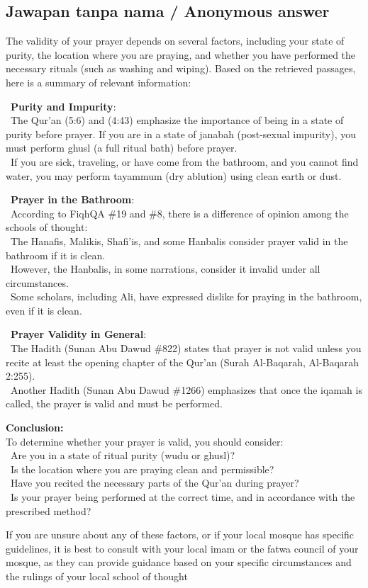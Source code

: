 \documentclass[11pt,a4paper]{article}
\begin{document}
\subsection*{Jawapan tanpa nama / Anonymous answer}
The validity of your prayer depends on several factors, including your state of purity, the location where you are praying, and whether you have performed the necessary rituals (such as washing and wiping). Based on the retrieved passages, here is a summary of relevant information:\par\medskip \textbullet\ \textbf{Purity and Impurity}:\\ \textbullet\ The Qur'an (5:6) and (4:43) emphasize the importance of being in a state of purity before prayer. If you are in a state of janabah (post-sexual impurity), you must perform ghusl (a full ritual bath) before prayer.\\ \textbullet\ If you are sick, traveling, or have come from the bathroom, and you cannot find water, you may perform tayammum (dry ablution) using clean earth or dust.\par\medskip \textbullet\ \textbf{Prayer in the Bathroom}:\\ \textbullet\ According to FiqhQA \#19 and \#8, there is a difference of opinion among the schools of thought:\\ \textbullet\ The Hanafis, Malikis, Shafi'is, and some Hanbalis consider prayer valid in the bathroom if it is clean.\\ \textbullet\ However, the Hanbalis, in some narrations, consider it invalid under all circumstances.\\ \textbullet\ Some scholars, including Ali, have expressed dislike for praying in the bathroom, even if it is clean.\par\medskip \textbullet\ \textbf{Prayer Validity in General}:\\ \textbullet\ The Hadith (Sunan Abu Dawud \#822) states that prayer is not valid unless you recite at least the opening chapter of the Qur'an (Surah Al-Baqarah, Al-Baqarah 2:255).\\ \textbullet\ Another Hadith (Sunan Abu Dawud \#1266) emphasizes that once the iqamah is called, the prayer is valid and must be performed.\par\medskip \textbf{Conclusion:}\\ To determine whether your prayer is valid, you should consider:\\ \textbullet\ Are you in a state of ritual purity (wudu or ghusl)?\\ \textbullet\ Is the location where you are praying clean and permissible?\\ \textbullet\ Have you recited the necessary parts of the Qur'an during prayer?\\ \textbullet\ Is your prayer being performed at the correct time, and in accordance with the prescribed method?\par\medskip If you are unsure about any of these factors, or if your local mosque has specific guidelines, it is best to consult with your local imam or the fatwa council of your mosque, as they can provide guidance based on your specific circumstances and the rulings of your local school of thought
\end{document}
